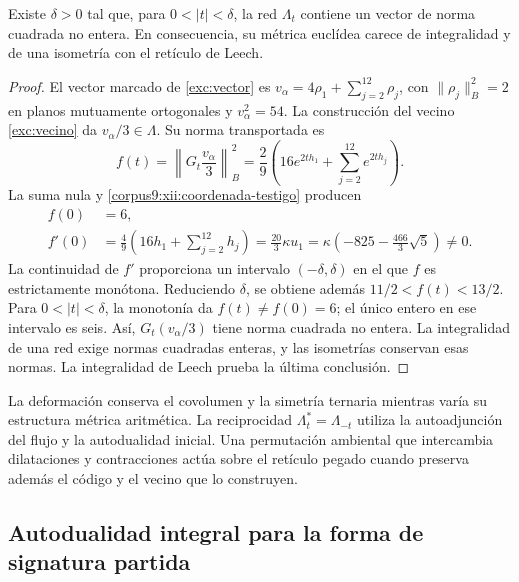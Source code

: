 \begin{proposition}
\label{corpus9:xii:testigo-integralidad}
Existe \(\delta>0\) tal que, para \(0<|t|<\delta\), la red
\(\Lambda_t\) contiene un vector de norma cuadrada no entera.
En consecuencia, su métrica euclídea carece de integralidad y de una
isometría con el retículo de Leech.
\end{proposition}
\begin{proof}
El vector marcado de \eqref{exc:vector} es
\(v_\alpha=4\rho_1+\sum_{j=2}^{12}\rho_j\), con
\(\|\rho_j\|_B^2=2\) en planos mutuamente ortogonales y
\(v_\alpha^2=54\). La construcción del vecino
\eqref{exc:vecino} da \(v_\alpha/3\in\Lambda\). Su norma transportada es
\begin{equation}
 f(t)=\left\|G_t\frac{v_\alpha}{3}\right\|_B^2
 =\frac29\left(16e^{2th_1}+\sum_{j=2}^{12}e^{2th_j}\right).
 \label{corpus9:xii:norma-testigo}
\end{equation}
La suma nula y \eqref{corpus9:xii:coordenada-testigo} producen
\begin{equation}
 \begin{aligned}
 f(0)&=6,\\
 f'(0)&=\frac49\left(16h_1+\sum_{j=2}^{12}h_j\right)
       =\frac{20}{3}\kappa u_1
       =\kappa\left(-825-\frac{466}{3}\sqrt5\right)\ne0.
 \end{aligned}
 \label{corpus9:xii:derivada-testigo}
\end{equation}
La continuidad de \(f'\) proporciona un intervalo
\((-\delta,\delta)\) en el que \(f\) es estrictamente monótona.
Reduciendo \(\delta\), se obtiene además
\(11/2<f(t)<13/2\). Para \(0<|t|<\delta\), la monotonía da
\(f(t)\ne f(0)=6\); el único entero en ese intervalo es seis.
Así, \(G_t(v_\alpha/3)\) tiene norma cuadrada no entera. La
integralidad de una red exige normas cuadradas enteras, y las isometrías
conservan esas normas. La integralidad de Leech prueba la última
conclusión.
\end{proof}

La deformación conserva el covolumen y la simetría ternaria mientras
varía su estructura métrica aritmética. La reciprocidad
\(\Lambda_t^*=\Lambda_{-t}\) utiliza la autoadjunción del flujo y
la autodualidad inicial. Una permutación ambiental que intercambia
dilataciones y contracciones actúa sobre el retículo pegado cuando
preserva además el código y el vecino que lo construyen.

\subsection{Autodualidad integral para la forma de signatura partida}
\label{corpus9:xii:autodualidad-partida}

